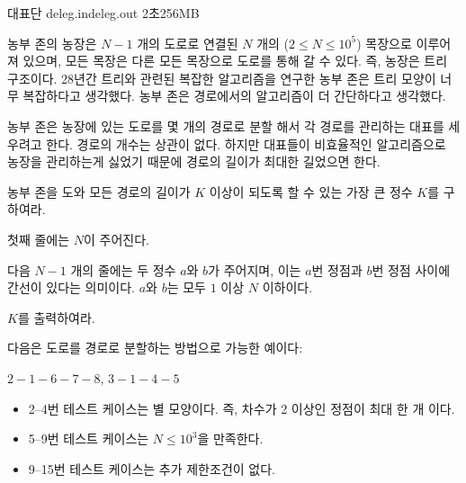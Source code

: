 \begin{problem}{대표단}
	{deleg.in}{deleg.out}
	{2초}{256MB}{}
	
	농부 존의 농장은 $N-1$ 개의 도로로 연결된 $N$ 개의 ($2 \le N \le 10^5$) 목장으로 이루어져 있으며, 모든 목장은 다른 모든 목장으로 도로를 통해 갈 수 있다. 즉, 농장은 트리 구조이다. 28년간 트리와 관련된 복잡한 알고리즘을 연구한 농부 존은 트리 모양이 너무 복잡하다고 생각했다. 농부 존은 경로에서의 알고리즘이 더 간단하다고 생각했다.
	
	농부 존은 농장에 있는 도로를 몇 개의 경로로 분할 해서 각 경로를 관리하는 대표를 세우려고 한다. 경로의 개수는 상관이 없다. 하지만 대표들이 비효율적인 알고리즘으로 농장을 관리하는게 싫었기 때문에 경로의 길이가 최대한 길었으면 한다.
	
	농부 존을 도와 모든 경로의 길이가 $K$ 이상이 되도록 할 수 있는 가장 큰 정수 $K$를 구하여라.
	
	\InputFile
	
	첫째 줄에는 $N$이 주어진다.
	
	다음 $N-1$ 개의 줄에는 두 정수 $a$와 $b$가 주어지며, 이는 $a$번 정점과 $b$번 정점 사이에 간선이 있다는 의미이다. $a$와 $b$는 모두 $1$ 이상 $N$ 이하이다.
	
	
	\OutputFile
	
	$K$를 출력하여라.
	
	\Example
		
	\begin{example}
	\end{example}
	
	다음은 도로를 경로로 분할하는 방법으로 가능한 예이다:
	
	\begin{center}
		$2 - 1 - 6 - 7 - 8$, $3 - 1 - 4 - 5$
	\end{center}
	
	\Scoring
	
	\begin{itemize}
		\item 2--4번 테스트 케이스는 별 모양이다. 즉, 차수가 2 이상인 정점이 최대 한 개 이다.
		\item 5--9번 테스트 케이스는 $N \le 10^3$을 만족한다.
		\item 9--15번 테스트 케이스는 추가 제한조건이 없다.
	\end{itemize}
	
	
	
	
\end{problem}

